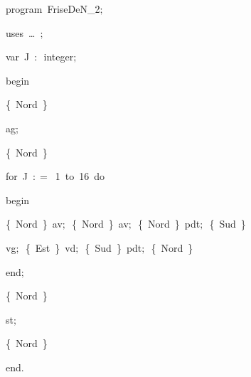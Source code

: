 
{
\parindent {}
\medskip

\carrenoir
\vspace{\neglskip}\mbox{\blc  \idt  \mcl program\idt \ FriseDeN\_2$;$
}\par 
\vspace{\neglskip}\mbox{\blc \blk\idt \mcl uses\idt \ \ldots\ $;$
}\par 
\pagebreak[3] 
\vspace{\neglskip}\mbox{\blc  \blk\idt  \mcl var\idt \ J\ $:$\ integer$;$}\par 
\vspace{\neglskip}\mbox{\blc  \idt  \mcl begin\idt \ }\par 
\vspace{\neglskip}\mbox{\blc  \blk\idt  \cmt  \{\ Nord\ \}\idt }\par 
\vspace{\neglskip}\mbox{\blc  \blk\idt  ag$;$}\par 
\vspace{\neglskip}\mbox{\blc  \blk\idt  \cmt  \{\ Nord\ \}\idt }\par 
\pagebreak[3] 
\vspace{\neglskip}\mbox{\blc  \blk\idt  \mcl for\idt \ J\ $:$$=$\ 1\ \mcl to\idt \ 16\ \mcl do\idt }\par 
\vspace{\neglskip}\mbox{\blc  \blk\blk\idt  \mcl begin\idt }\par 
\vspace{\neglskip}\mbox{\blc  \blk\blk\blk\idt  \cmt  \{\ Nord\ \}\idt \ av$;$\ \cmt  \{\ Nord\ \}\idt \ av$;$\ \cmt  \{\ Nord\ \}\idt \ pdt$;$\ \cmt  \{\ Sud\ \}\idt \ }\par 
\vspace{\neglskip}\mbox{\blc  \blk\blk\blk\idt  vg$;$\ \cmt  \{\ Est\ \}\idt \ vd$;$\ \cmt  \{\ Sud\ \}\idt \ pdt$;$\ \cmt  \{\ Nord\ \}\idt \ }\par 
\vspace{\neglskip}\mbox{\blc  \blk\blk\idt  \mcl end\idt $;$}\par 
\vspace{\neglskip}\mbox{\blc  \blk\idt  \cmt  \{\ Nord\ \}\idt \ }\par 
\vspace{\neglskip}\mbox{\blc  \blk\idt  st$;$}\par 
\vspace{\neglskip}\mbox{\blc  \blk\idt  \cmt  \{\ Nord\ \}\idt \ }\par 
\vspace{\neglskip}\mbox{\blc  \idt  \mcl end\idt $.$}\par 

\medskip }

